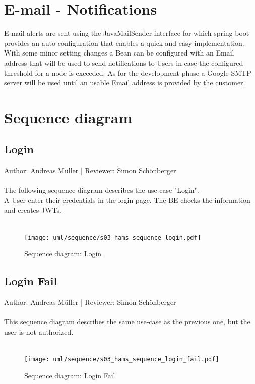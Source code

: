 \documentclass{scrreprt}
\begin{document}
\section{E-mail - Notifications}
E-mail alerts are sent using the JavaMailSender interface for which spring boot provides an auto-configuration that enables a quick and easy implementation. With some minor setting changes a Bean can be configured with an Email address that will be used to send notifications to Users in case the configured threshold for a node is exceeded. As for the development phase a Google SMTP server will be used until an usable Email address is provided by the customer.
\pagebreak
\section{Sequence diagram}
\subsection{Login}
Author:  Andreas M\"uller |
Reviewer: Simon Sch\"onberger\\ \\
The following sequence diagram describes the use-case "Login". \\
A User enter their credentials in the login page. The BE checks the information and creates JWTs.
\\ \\
\begin{figure}[h]
	\centering
	\texttt{[image: uml/sequence/s03\_hams\_sequence\_login.pdf]}
	\caption{Sequence diagram: Login}
	\label{alertSequence}
\end{figure}
\pagebreak
\subsection{Login Fail}
Author:  Andreas M\"uller |
Reviewer: Simon Sch\"onberger\\ \\
This sequence diagram describes the same use-case as the previous one,
but the user is not authorized.
\\ \\
\begin{figure}[h]
	\centering
	\texttt{[image: uml/sequence/s03\_hams\_sequence\_login\_fail.pdf]}
	\caption{Sequence diagram: Login Fail}
	\label{failSequence}
\end{figure}
\pagebreak
\end{document}
